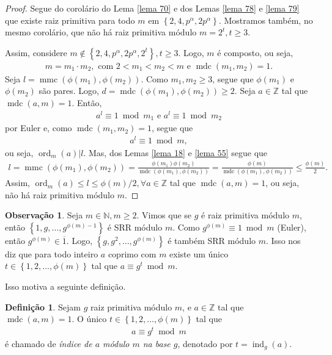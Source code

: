 \documentclass[a4paper,11pt,twoside, leqno]{article}
\DeclareMathOperator{\mdc}{mdc}
\DeclareMathOperator{\mmc}{mmc}
\DeclareMathOperator{\Ord}{ord}
\DeclareMathOperator{\ind}{ind}
\theoremstyle{definition}
\newtheorem*{definition}{Definição}
\newtheorem{remark}{Observação}[section]
\begin{document}
\begin{proof}
	Segue do corolário do Lema \eqref{lema 70} e dos Lemas \eqref{lema 78} e \eqref{lema 79} que existe raiz primitiva para todo $m$ em $\left\{ 2,4,p^\alpha,2p^\alpha \right\}$. Mostramos também, no mesmo corolário, que não há raiz primitiva módulo $m = 2^t, t\geq 3$.
	\par\vspace{0.3cm} Assim, considere $m\notin\left\{ 2,4,p^\alpha,2p^\alpha,2^t \right\}, t\geq 3$. Logo, $m$ é composto, ou seja,
	\begin{align*}
	m = m_1\cdot m_2, \text{ com } 2<m_1<m_2<m \text{ e } \mdc(m_1,m_2) = 1.
	\end{align*}
	Seja $l = \mmc(\phi(m_1), \phi(m_2))$. Como $m_1, m_2\geq 3$, segue que $\phi(m_1)$ e $\phi(m_2)$ são pares. Logo, $d = \mdc(\phi(m_1), \phi(m_2))\geq 2$. Seja $a\in\mathbb{Z}$ tal que $\mdc(a,m) = 1$. Então,
	\begin{align*}
	a^l\equiv 1\bmod m_1 \text{ e } a^l\equiv 1\bmod m_2
	\end{align*}
	por Euler e, como $\mdc(m_1,m_2) = 1$, segue que
	\begin{align*}
	a^l\equiv 1\bmod m,
	\end{align*}
	ou seja, $\Ord_m(a)|l$. Mas, dos Lemas \eqref{lema 18} e \eqref{lema 55} segue que
	\begin{align*}
	l = \mmc(\phi(m_1), \phi(m_2)) = \frac{ \phi(m_1)\phi(m_2) }{\mdc( \phi(m_1), \phi(m_2) )} = \frac{ \phi(m) }{\mdc( \phi(m_1), \phi(m_2) )} \leq \frac{\phi(m)}{2}.
	\end{align*}
	Assim, $\Ord_m(a)\leq l\leq \phi(m)/2, \forall a\in\mathbb{Z}$ tal que $\mdc(a,m) = 1$, ou seja, não há raiz primitiva módulo $m$.
\end{proof}
\begin{remark}
	Seja $m\in\mathbb{N}, m\geq 2$. Vimos que se $g$ é raiz primitiva módulo $m$, então $\left\{ 1,g,\dots,g^{\phi(m) - 1} \right\}$ é SRR módulo $m$. Como $g^{\phi(m)}\equiv 1\bmod m$ (Euler), então $g^{\phi(m)}\in\overline{1}$. Logo, $\left\{ g, g^2, \dots, g^{\phi(m)} \right\}$ é também SRR módulo $m$. Isso nos diz que para todo inteiro $a$ coprimo com $m$ existe um único $t\in\left\{ 1,2,\dots, \phi(m) \right\}$ tal que $a\equiv g^t\bmod m$.
\end{remark}
Isso motiva a seguinte definição.
\begin{definition}
	Sejam $g$ raiz primitiva módulo $m$, e $a\in\mathbb{Z}$ tal que $\mdc(a,m) = 1$. O único $t\in\left\{ 1,2,\dots,\phi(m) \right\}$ tal que
	\begin{align*}
	a\equiv g^t\bmod m
	\end{align*}
	é chamado de {\em índice de $a$ módulo $m$ na base $g$}, denotado por $t = \ind_g(a)$.
\end{definition}
\end{document}
